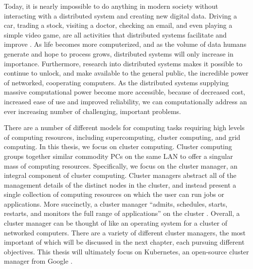 Today, it is nearly impossible to do
anything in modern society without interacting with a distributed system and
creating new digital data. Driving a car, trading a stock, visiting a doctor,
checking an email, and even playing a simple video game, are all activities that
distributed systems facilitate and improve \cite{distributed-systems-concepts-and-design}.
As life becomes more
computerized, and as the volume of data humans generate and hope to process
grows, distributed systems will only increase in importance.
Furthermore, research into distributed systems makes it possible to
continue to unlock, and make available to the general public,
the incredible power of networked, cooperating computers. As the distributed systems
supplying massive computational power become more
accessible, because of decreased cost, increased ease of use and
improved reliability, we can
computationally address an ever increasing number of challenging, important problems.

There are a number of different models for computing tasks requiring high levels
of computing resources, including supercomputing, cluster computing, and grid
computing. In this thesis, we focus on cluster computing. Cluster computing
groups together similar commodity PCs on the same LAN to offer a singular mass
of computing resources. Specifically, we focus on the
cluster manager, an integral component of cluster computing. Cluster managers
abstract all of the management details of the distinct
nodes in the cluster, and instead present a single collection of computing
resources on which the user can run jobs or applications. More succinctly,
a cluster manager ``admits, schedules, starts, restarts, and monitors the full
range of applications'' on the cluster \cite{borg}. Overall, a cluster
manager can be thought of like an operating system
for a cluster of networked computers. There are a
variety of different cluster managers, the most important of which will be
discussed in the next chapter, each pursuing different objectives. This
thesis will ultimately focus on Kubernetes, an open-source cluster
manager from Google \cite{k8s-website}.

